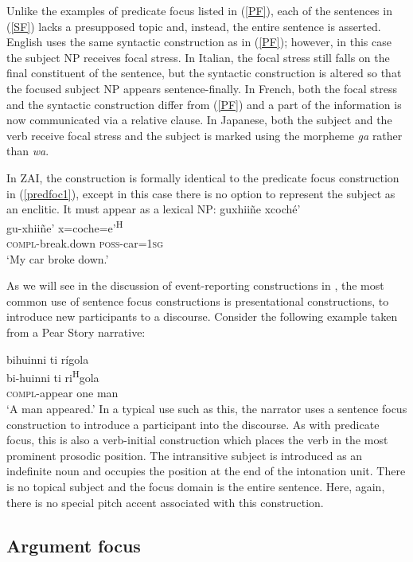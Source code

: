 Unlike the examples of predicate focus listed in (\ref{PF}), each of the sentences in (\ref{SF}) lacks a presupposed topic and, instead, the entire sentence is asserted. English uses the same syntactic construction as in (\ref{PF}); however, in this case the subject NP receives focal stress. In Italian, the focal stress still falls on the final constituent of the sentence, but the syntactic construction is altered so that the focused subject NP appears sentence-finally. In French, both the focal stress and the syntactic construction differ from (\ref{PF}) and a part of the information is now communicated via a relative clause.  In Japanese, both the subject and the verb receive focal stress and the subject is marked using the morpheme \textit{ga} rather than \textit{wa}.

In ZAI, the construction is formally identical to the predicate focus construction in (\ref{predfoc1}), except in this case there is no option to represent the subject as an enclitic. It must appear as a lexical NP:
\ea 
\glll guxhii\~{n}e xcoch\'{e}' \\
gu-xhii\~{n}e' x=coche=e'\textsuperscript{H} \\
\textsc{compl}-break.down \textsc{poss}-car=\textsc{1sg} \\
\glt `My car broke down.'
\z

As we will see in the discussion of event-reporting constructions in , the most common use of sentence focus constructions is presentational constructions, to introduce new participants to a discourse. Consider the following example taken from a Pear Story narrative:

\ea
\glll bihuinni ti r\'{i}gola  \\
bi-huinni ti ri\textsuperscript{H}gola \\
\textsc{compl}-appear one man \\
\glt `A man appeared.' 
\z
In a typical use such as this, the narrator uses a sentence focus construction to introduce a participant into the discourse. As with predicate focus, this is also a verb-initial construction which places the verb in the most prominent prosodic position. The intransitive subject is introduced as an indefinite noun and occupies the position at the end of the intonation unit. There is no topical subject and the focus domain is the entire sentence. Here, again, there is no special pitch accent associated with this construction.  


\subsection{Argument focus}\label{afsection}

